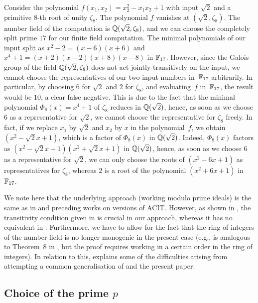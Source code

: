 \begin{example}
\label{ex:generalisation}
Consider the polynomial $f(x_1,x_2) = x_2^2 - x_1 x_2 + 1$ with input $\sqrt{2}$ and a primitive $8$-th root of unity $\zeta_8$. The polynomial $f$ vanishes at $(\sqrt{2},\zeta_8)$. The number field of the computation is $\mathbb{Q}(\sqrt{2},\zeta_8)$, and we can choose the completely split prime $17$ for our finite field computation. The minimal polynomials of our input split as $x^2 - 2 = (x-6)(x+6)$ and $x^4 + 1 = (x+2)(x-2)(x+8)(x-8)$ in $\mathbb{F}_{17}$. However, since the Galois group of the field $\mathbb{Q}(\sqrt{2},\zeta_8)$ does not act jointly-transitively on the input, we cannot choose the representatives of our two input numbers in~$\mathbb{F}_{17}$ arbitrarily. In particular, by choosing $6$ for $\sqrt{2}$ and $2$ for $\zeta_8$, and evaluating~$f$ in~$\mathbb{F}_{17}$, the result would be $10$, a clear false negative. This is due to the fact that the minimal polynomial $\Phi_8(x) = x^4 + 1$ of $\zeta_8$ reduces in $\mathbb{Q}(\sqrt{2})$, hence, as soon as we choose $6$ as a representative for $\sqrt{2}$, we cannot choose the representative for $\zeta_8$ freely. In fact, if we replace $x_1$ by $\sqrt{2}$ and $x_2$ by $x$ in the polynomial~$f$, we obtain $(x^2 - \sqrt{2}x + 1)$,
 which is a factor of $\Phi_8(x)$ in $\mathbb{Q}(\sqrt{2})$. Indeed, $\Phi_8(x)$ factors as $(x^2 - \sqrt{2}x + 1)(x^2 + \sqrt{2}x + 1)$ in $\mathbb{Q}(\sqrt{2})$, hence, as soon as we choose $6$ as a representative for $\sqrt{2}$, we can only choose the roots of
 $(x^2 - 6x + 1)$
 as representatives for $\zeta_8$, whereas $2$
 is a root of the polynomial $(x^2 + 6x + 1)$ in $\mathbb{F}_{17}$.
\end{example}

We note here that the underlying approach (working modulo prime ideals) is the same as in \cite{balaji2021cyclotomic} and preceding works on versions of ACIT.
However, as shown in , the transitivity condition given in 
 is crucial in our approach, whereas it has no equivalent in \cite{balaji2021cyclotomic}.
Furthermore, we have to allow for the fact that the ring of integers of the number field is no longer monogenic in the present case (e.g.,  is analogous to Theorem~8 in \cite{balaji2021cyclotomic}, but the proof requires working in a certain order in the ring of integers). 
In relation to this,  explains some of the difficulties arising from attempting a common generalisation of \cite{balaji2021cyclotomic} and the present paper.


\subsection{Choice of the prime $p$}

